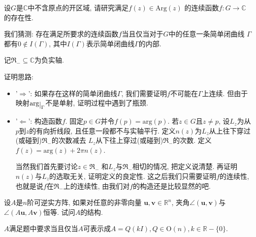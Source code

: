 \documentclass[a4paper,12pt]{ctexart}
\title{\TITLE}
\author{\AUTHOR}
\date{\today}
\newcommand\restrict[1]{\raisebox{-.5ex}{$|$}_{#1}}
\begin{document}

    \begin{problem}
        设$G$是$\mathbb{C}$中不含原点的开区域, 请研究满足$f(z)\in \mathrm{Arg}(z)$
        的连续函数$f:G\to \mathbb{C}$的存在性.
    \end{problem}

    我们猜测: 存在满足所要求的连续函数$f$当且仅当对于$G$中的任意一条简单闭曲线
    $\Gamma$都有$0\notin I(\Gamma)$,
    其中$I(\Gamma)$表示简单闭曲线$\Gamma$的内部.

    记$\mathfrak{R}_{-} \subseteq \mathbb{C}$为负实轴.

    证明思路:
    \begin{itemize}
    \item '$\Rightarrow$': 如果存在这样的简单闭曲线$\Gamma$,
        我们需要证明$f$不可能在$\Gamma$上连续.
        但由于映射$\mathrm{arg}\restrict{\Gamma}$不是单射, 证明过程中遇到了瓶颈.
    \item '$\Leftarrow$': 构造函数$f$. 固定$p \in G$并令$f(p)=\mathrm{arg}(p)$.
        若$z\in G$且$z \neq p$, 设$L_z$为从$p$到$z$的有向折线段,
        且任意一段都不与实轴平行.
        定义$n(z)$为$L_z$从上往下穿过(或碰到)$\mathfrak{R}_{-}$的次数减去
        $L_z$从下往上穿过(或碰到)$\mathfrak{R}_{-}$的次数.
        定义$f(z) = \mathrm{arg}(z)+2\pi n(z)$.

        当然我们首先要讨论$z\in \mathfrak{R}_{-}$
        和$L_z$与$\mathfrak{R}_{-}$相切的情况, 把定义说清楚.
        再证明$n(z)$与$L_z$的选取无关, 证明定义的良定性.
        这之后我们只需要证明$f$的连续性, 也就是说$f$在$\mathfrak{R}_{-}$上的连续性,
        由我们对$f$的构造还是比较显然的吧.
    \end{itemize}
    \begin{problem}
        设$A$是$n$阶可逆实方阵, 如果对任意的非零向量
        $\pmb{u}, \pmb{v} \in \mathbb{R}^n$, 夹角$\angle(\pmb{u}, \pmb{v})$与
        $\angle(A\pmb{u}, A\pmb{v})$恒等. 试问$A$的结构.
    \end{problem}
    
    $A$满足题中要求当且仅当$A$可表示成$A=Q(kI), Q\in \mathrm{O}(n), k\in \mathbb{R}-\{0\}$.
\end{document}
